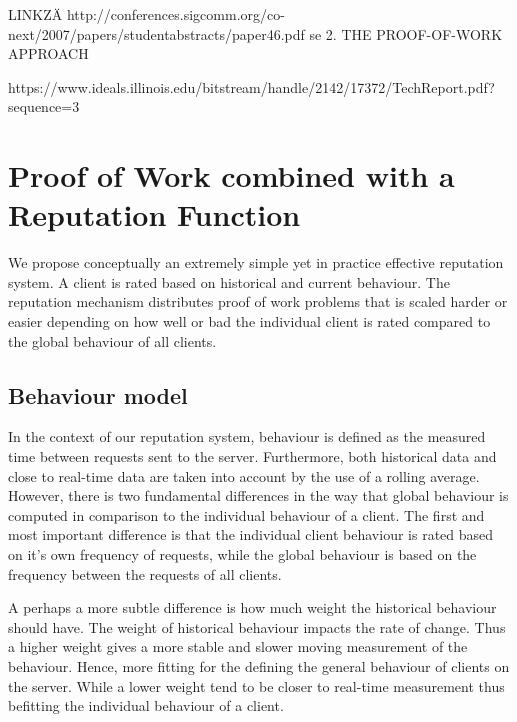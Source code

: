 LINKZÄ http://conferences.sigcomm.org/co-next/2007/papers/studentabstracts/paper46.pdf se 2. THE PROOF-OF-WORK APPROACH

https://www.ideals.illinois.edu/bitstream/handle/2142/17372/TechReport.pdf?sequence=3

\section{Proof of Work combined with a Reputation Function}\label{tab:reputation}
We propose conceptually an extremely simple yet in practice effective reputation system. A client is rated based on historical and current behaviour. The reputation mechanism distributes proof of work problems that is scaled harder or easier depending on how well or bad the individual client is rated compared to the global behaviour of all clients. 

\subsection{Behaviour model}\label{tab:behaviourmodel}
In the context of our reputation system, behaviour is defined as the measured time between requests sent to the server. Furthermore, both historical data and close to real-time data are taken into account by the use of a rolling average. However, there is two fundamental differences in the way that global behaviour is computed in comparison to the individual behaviour of a client. The first and most important difference is that the individual client behaviour is rated based on it's own frequency of requests, while the global behaviour is based on the frequency between the requests of all clients. 

A perhaps a more subtle difference is how much weight the historical behaviour should have. The weight of historical behaviour impacts the rate of change. Thus a higher weight gives a more stable and slower moving measurement of the behaviour. Hence, more fitting for the defining the general behaviour of clients on the server. While a lower weight tend to be closer to real-time measurement thus befitting the individual behaviour of a client.
